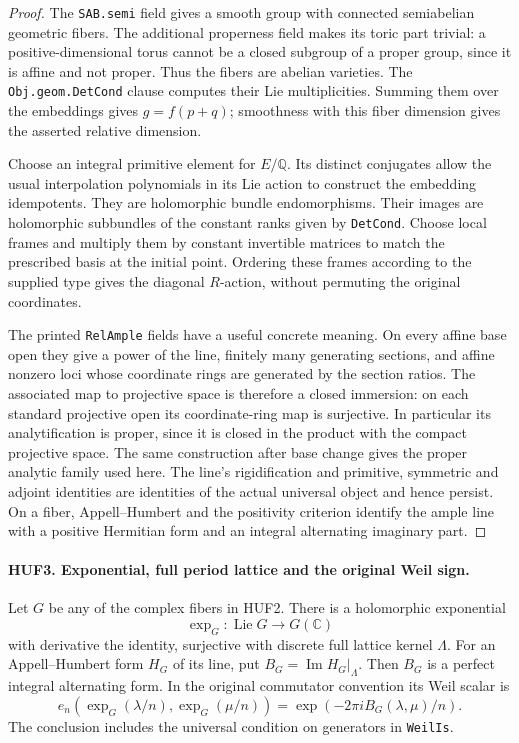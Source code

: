 \begin{proof}
The \texttt{SAB.semi} field gives a smooth group with connected
semiabelian geometric fibers.  The additional properness field
makes its toric part trivial: a positive-dimensional torus cannot
be a closed subgroup of a proper group, since it is affine and
not proper.  Thus the fibers are abelian varieties.  The
\texttt{Obj.geom.DetCond} clause computes their Lie multiplicities.
Summing them over the embeddings gives \(g=f(p+q)\);
smoothness with this fiber dimension gives the asserted relative
dimension.

Choose an integral primitive element for \(E/\mathbb Q\).
Its distinct conjugates allow the usual interpolation polynomials
in its Lie action to construct the embedding idempotents.
They are holomorphic bundle endomorphisms.  Their images are
holomorphic subbundles of the constant ranks given by
\texttt{DetCond}.  Choose local frames and multiply them by constant
invertible matrices to match the prescribed basis at the initial
point.  Ordering these frames according to the supplied type gives
the diagonal \(R\)-action, without permuting the original coordinates.

The printed \texttt{RelAmple} fields have a useful concrete meaning.
On every affine base open they give a power of the line, finitely
many generating sections, and affine nonzero loci whose coordinate
rings are generated by the section ratios.  The associated map
to projective space is therefore a closed immersion: on each
standard projective open its coordinate-ring map is surjective.
In particular its analytification is proper, since it is closed
in the product with the compact projective space.  The same
construction after base change gives the proper analytic family
used here.  The line's rigidification and primitive, symmetric
and adjoint identities are identities of the actual universal
object and hence persist.  On a fiber, Appell--Humbert and the
positivity criterion identify the ample line with a positive
Hermitian form and an integral alternating imaginary part.
\end{proof}

\paragraph{HUF3. Exponential, full period lattice and the original Weil sign.}
\label{claim:HUF3}
Let \(G\) be any of the complex fibers in HUF2.
There is a holomorphic exponential
\[
       \exp_G:\operatorname{Lie}G\longrightarrow G(\mathbb C)
 \tag{HUF.3}
\]
with derivative the identity, surjective with discrete full
lattice kernel \(\Lambda\).  For an Appell--Humbert form
\(H_G\) of its line, put \(B_G=\operatorname{Im}H_G|_\Lambda\).
Then \(B_G\) is a perfect integral alternating form.  In the
original commutator convention its Weil scalar is
\[
 e_n(\exp_G(\lambda/n),\exp_G(\mu/n))
                     =\exp(-2\pi iB_G(\lambda,\mu)/n).
 \tag{HUF.4}
\]
The conclusion includes the universal condition on generators
in \texttt{WeilIs}.

